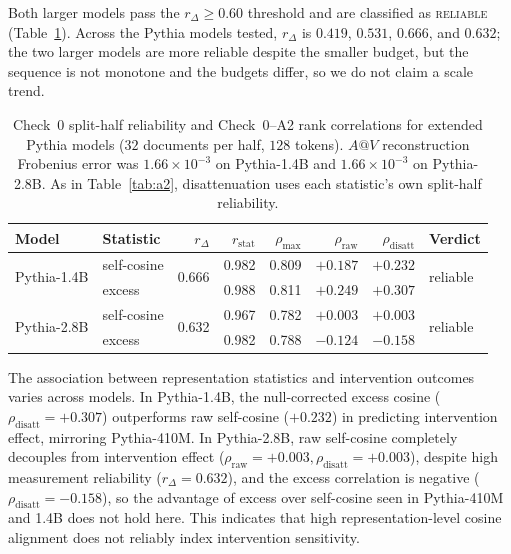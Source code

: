 \documentclass{article} %
\begin{document}
Both larger models pass the $r_\Delta \ge 0.60$ threshold and are classified as \textsc{reliable} (Table~\ref{tab:extended_reliability}). Across the Pythia models tested, $r_\Delta$ is $0.419$, $0.531$, $0.666$, and $0.632$; the two larger models are more reliable despite the smaller budget, but the sequence is not monotone and the budgets differ, so we do not claim a scale trend.

\begin{table}[h]
\centering
\small
\begin{tabular}{@{}llrrrrrl@{}}
\toprule
Model & Statistic & $r_\Delta$ & $r_{\text{stat}}$ & $\rho_{\max}$ & $\rho_{\text{raw}}$ & $\rho_{\text{disatt}}$ & Verdict \\
\midrule
\multirow{2}{*}{Pythia-1.4B}
  & self-cosine & \multirow{2}{*}{0.666} & 0.982 & 0.809 & $+0.187$ & $+0.232$ & \multirow{2}{*}{reliable} \\
  & excess      &                        & 0.988 & 0.811 & $+0.249$ & $+0.307$ & \\
\midrule
\multirow{2}{*}{Pythia-2.8B}
  & self-cosine & \multirow{2}{*}{0.632} & 0.967 & 0.782 & $+0.003$ & $+0.003$ & \multirow{2}{*}{reliable} \\
  & excess      &                        & 0.982 & 0.788 & $-0.124$ & $-0.158$ & \\
\bottomrule
\end{tabular}
\caption{Check~0 split-half reliability and Check~0--A2 rank correlations for extended Pythia models ($32$ documents per half, $128$ tokens). $A@V$ reconstruction Frobenius error was $1.66\times 10^{-3}$ on Pythia-1.4B and $1.66\times 10^{-3}$ on Pythia-2.8B. As in Table~\ref{tab:a2}, disattenuation uses each statistic's own split-half reliability.}
\label{tab:extended_reliability}
\end{table}

The association between representation statistics and intervention outcomes varies across models. In Pythia-1.4B, the null-corrected excess cosine ($\rho_{\text{disatt}} = +0.307$) outperforms raw self-cosine ($+0.232$) in predicting intervention effect, mirroring Pythia-410M. In Pythia-2.8B, raw self-cosine completely decouples from intervention effect ($\rho_{\text{raw}} = +0.003, \rho_{\text{disatt}} = +0.003$), despite high measurement reliability ($r_\Delta = 0.632$), and the excess correlation is negative ($\rho_{\text{disatt}} = -0.158$), so the advantage of excess over self-cosine seen in Pythia-410M and 1.4B does not hold here. This indicates that high representation-level cosine alignment does not reliably index intervention sensitivity.
\end{document}
